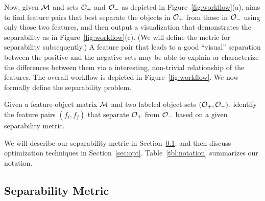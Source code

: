 Now, given ${\mathcal{M}}$ and sets
${\mathcal{O}}_+$ and ${\mathcal{O}}_-$ as depicted in Figure~\ref{fig:workflow}(a),
\genviz aims to find feature pairs that
best separate the objects
in ${\mathcal{O}}_+$ from those in ${\mathcal{O}}_-$ using only those two features,
and then output a visualization that demonstrates the separability
as in Figure~\ref{fig:workflow}(c).
(We will define the metric for separability subsequently.)
A feature pair that leads to a good ``visual'' separation
between the positive and the negative sets may be able
to explain or characterize the differences between them
via a interesting,
non-trivial relationship of the features.
The overall workflow is depicted in Figure~\ref{fig:workflow}.
We now formally define the separability problem.
\begin{formulation}[Separability]\label{prob:separability}
Given a feature-object matrix ${\mathcal{M}}$ and two labeled object sets $({\mathcal{O}}_+,{\mathcal{O}}_-)$, identify the \topk feature pairs $(f_i,f_j)$ that separate ${\mathcal{O}}_+$ from ${\mathcal{O}}_-$ based on a given separability metric.
\end{formulation}
\noindent %
We will describe our separability metric in Section~\ref{sec:metric}, and then discuss optimization techniques in Section~\ref{sec:opt}. Table~\ref{tbl:notation} summarizes our notation.



\subsection{Separability Metric}\label{sec:metric}


